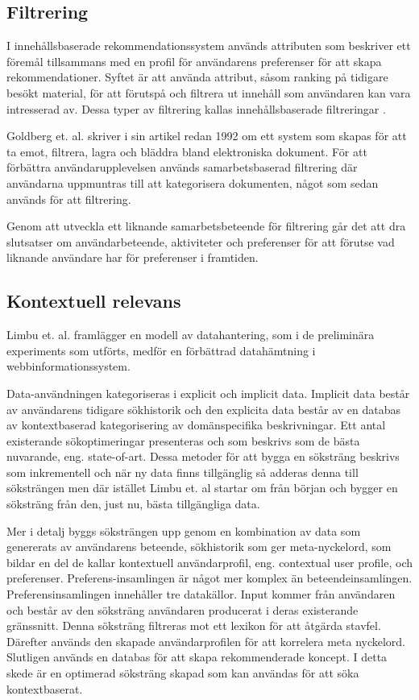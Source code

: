 \documentclass[a4paper,11pt]{article}
\begin{document}
{\subsection{Filtrering}
I innehållsbaserade rekommendationssystem används attributen som beskriver ett föremål tillsammans med en profil för användarens preferenser för att skapa rekommendationer. Syftet är att använda attribut, såsom ranking på tidigare besökt material, för att förutspå och filtrera ut innehåll som användaren kan vara intresserad av. Dessa typer av filtrering kallas innehållsbaserade filtreringar \cite{Basilico}.

Goldberg et. al. \cite{Goldberg} skriver i sin artikel redan 1992 om ett system som skapas för att ta emot, filtrera, lagra och bläddra bland elektroniska dokument. För att förbättra användarupplevelsen används samarbetsbaserad filtrering där användarna uppmuntras till att kategorisera dokumenten, något som sedan används för att filtrering.

Genom att utveckla ett liknande samarbetsbeteende för filtrering går det att dra slutsatser om användarbeteende, aktiviteter och preferenser för att förutse vad liknande användare har för preferenser i framtiden. 

\subsection{Kontextuell relevans}
Limbu et. al. \cite{Limbu} framlägger en modell av datahantering, som i de preliminära experiments som utförts, medför en förbättrad datahämtning i webbinformationssystem.

Data-användningen kategoriseras i explicit och implicit data. Implicit data består av användarens tidigare sökhistorik och den explicita data består av en databas av kontextbaserad kategorisering av domänspecifika beskrivningar. Ett antal existerande sökoptimeringar presenteras och som beskrivs som de bästa nuvarande, eng. state-of-art. Dessa metoder för att bygga en söksträng beskrivs som inkrementell och när ny data finns tillgänglig så adderas denna till söksträngen men där istället Limbu et. al \cite{Limbu} startar om från början och bygger en söksträng från den, just nu, bästa tillgängliga data.

Mer i detalj byggs söksträngen upp genom en kombination av data som genererats av användarens beteende, sökhistorik som ger meta-nyckelord, som bildar en del de kallar kontextuell användarprofil, eng. contextual user profile, och preferenser. Preferens-insamlingen är något mer komplex än beteendeinsamlingen. Preferensinsamlingen innehåller tre datakällor. Input kommer från användaren och består av den söksträng användaren producerat i deras existerande gränssnitt. Denna söksträng filtreras mot ett lexikon för att åtgärda stavfel. Därefter används den skapade användarprofilen för att korrelera meta nyckelord. Slutligen används en databas för att skapa rekommenderade koncept. I detta skede är en optimerad söksträng skapad som kan användas för att söka kontextbaserat.

}
\end{document}
